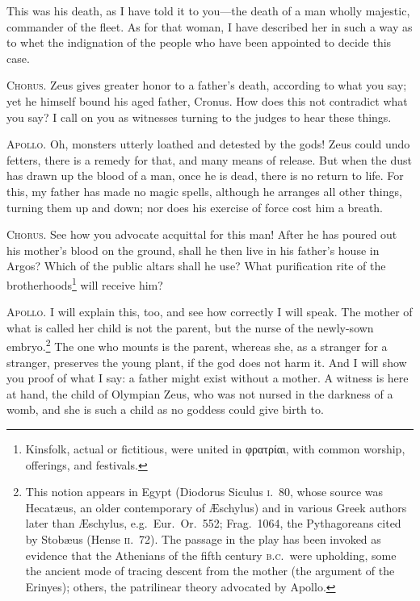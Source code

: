 \documentclass[12pt]{article}
\begin{document}
This was his death, as I have told it to you---the death of a man wholly majestic, commander of the fleet. As for that woman, I have described her in such a way as to whet the indignation of the people who have been appointed to decide this case.

\textsc{Chorus.} Zeus gives greater honor to a father's death, according to what you say; yet he himself bound his aged father, Cronus. How does this not contradict what you say? I call on you as witnesses turning to the judges to hear these things.

\textsc{Apollo.} Oh, monsters utterly loathed and detested by the gods! Zeus could undo fetters, there is a remedy for that, and many means of release. But when the dust has drawn up the blood of a man, once he is dead, there is no return to life. For this, my father has made no magic spells, although he arranges all other things, turning them up and down; nor does his exercise of force cost him a breath.

\textsc{Chorus.} See how you advocate acquittal for this man! After he has poured out his mother's blood on the ground, shall he then live in his father's house in Argos? Which of the public altars shall he use? What purification rite of the brotherhoods\footnote{Kinsfolk, actual or fictitious, were united in φρατρίαι, with common worship, offerings, and festivals.} will receive him?

\textsc{Apollo.} I will explain this, too, and see how correctly I will speak. The mother of what is called her child is not the parent, but the nurse of the newly-sown embryo.\footnote{This notion appears in Egypt (Diodorus Siculus \textsc{i}.~80, whose source was Hecat{\ae}us, an older contemporary of {\AE}schylus) and in various Greek authors later than {\AE}schylus, e.g.~Eur.~Or.~552; Frag.~1064, the Pythagoreans cited by Stob{\ae}us (Hense \textsc{ii}.~72). The passage in the play has been invoked as evidence that the Athenians of the fifth century \textsc{b.c.}~were upholding, some the ancient mode of tracing descent from the mother (the argument of the Erinyes); others, the patrilinear theory advocated by Apollo.} The one who mounts is the parent, whereas she, as a stranger for a stranger, preserves the young plant, if the god does not harm it. And I will show you proof of what I say: a father might exist without a mother. A witness is here at hand, the child of Olympian Zeus, who was not nursed in the darkness of a womb, and she is such a child as no goddess could give birth to.
\end{document}
